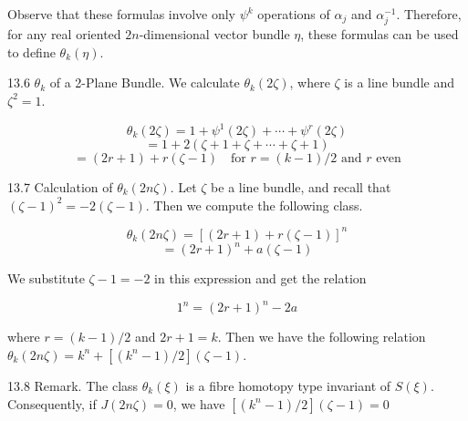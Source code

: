 Observe that these formulas involve only $\psi^k$ operations of $\alpha_j$ and $\alpha_j^{-1}$. Therefore, for any real oriented $2n$-dimensional vector bundle $\eta$, these formulas can be used to define $\theta_k(\eta)$.

13.6 $\theta_k$ of a 2-Plane Bundle. We calculate $\theta_k(2\zeta)$, where $\zeta$ is a line bundle and $\zeta^2 = 1$.

$$\theta_k(2\zeta) = 1 + \psi^1(2\zeta) + \cdots + \psi^r(2\zeta)$$
$$= 1 + 2(\zeta + 1 + \zeta + \cdots + \zeta + 1)$$
$$= (2r + 1) + r(\zeta - 1) \quad \text{for } r = (k - 1)/2 \text{ and } r \text{ even}$$

13.7 Calculation of $\theta_k(2n\zeta)$. Let $\zeta$ be a line bundle, and recall that $(\zeta - 1)^2 = -2(\zeta - 1)$. Then we compute the following class.

$$\theta_k(2n\zeta) = [(2r + 1) + r(\zeta - 1)]^n$$
$$= (2r + 1)^n + a(\zeta - 1)$$

We substitute $\zeta - 1 = -2$ in this expression and get the relation

$$1^n = (2r + 1)^n - 2a$$

where $r = (k - 1)/2$ and $2r + 1 = k$. Then we have the following relation $\theta_k(2n\zeta) = k^n + [(k^n - 1)/2](\zeta - 1)$.

13.8 Remark. The class $\theta_k(\xi)$ is a fibre homotopy type invariant of $S(\xi)$. Consequently, if $J(2n\zeta) = 0$, we have $[(k^n - 1)/2](\zeta - 1) = 0$

